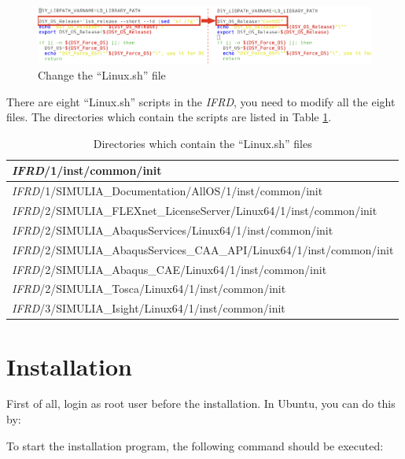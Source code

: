 \documentclass[12pt]{article}
\newcommand{\ifp}{\textit{IFRD}}
\newcommand{\cmd}[1]{
    \leavevmode{\parindent=0.05\textwidth\indent
    \begin{tabular}{>{\columncolor[gray]{0.8}}p{0.9\textwidth}}
        #1
    \end{tabular}
    }
}
\begin{document}
\begin{figure}[h!]
\begin{center}
    \includegraphics[width=\textwidth]{Figures/FakeLinux.png}
\end{center}
\caption{Change the ``Linux.sh'' file}
\label{fig-2}
\end{figure}

There are eight ``Linux.sh'' scripts in the \ifp, you need to modify all the eight files. The directories which contain the scripts are listed in Table \ref{tb-2}.

\begin{table}[h!]
\caption{Directories which contain the ``Linux.sh'' files}
\begin{center}
\begin{tabular}{l}
    \hline
    \ifp/1/inst/common/init \\
    \hline
    \ifp/1/SIMULIA\_Documentation/AllOS/1/inst/common/init \\
    \hline
    \ifp/2/SIMULIA\_FLEXnet\_LicenseServer/Linux64/1/inst/common/init \\
    \hline
    \ifp/2/SIMULIA\_AbaqusServices/Linux64/1/inst/common/init \\
    \hline
    \ifp/2/SIMULIA\_AbaqusServices\_CAA\_API/Linux64/1/inst/common/init \\
    \hline
    \ifp/2/SIMULIA\_Abaqus\_CAE/Linux64/1/inst/common/init \\
    \hline
    \ifp/2/SIMULIA\_Tosca/Linux64/1/inst/common/init \\
    \hline
    \ifp/3/SIMULIA\_Isight/Linux64/1/inst/common/init \\
    \hline
\end{tabular}
\end{center}
\label{tb-2}
\end{table}

\section*{Installation}
First of all, login as root user before the installation. In Ubuntu, you can do this by:

\cmd{sudo -s}

To start the installation program, the following command should be executed:
\end{document}
